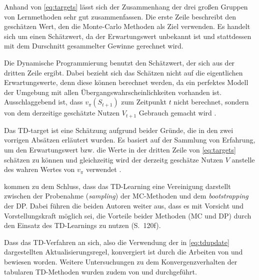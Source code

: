 Anhand von \ref{eq:targets} lässt sich der Zusammenhang der drei großen Gruppen von Lernmethoden sehr gut zusammenfassen. Die erste Zeile beschreibt den geschätzen Wert, den die Monte-Carlo Methoden als Ziel verwenden. Es handelt sich um einen Schätzwert, da der Erwartungswert unbekannt ist und stattdessen mit dem Durschnitt gesammelter Gewinne gerechnet wird. 
\par 
Die Dynamische Programmierung benutzt den Schätzwert, der sich aus der dritten Zeile ergibt. Dabei bezieht sich das Schätzen nicht auf die eigentlichen Erwartungswerte, denn diese können berechnet werden, da ein perfektes Modell der Umgebung mit allen Übergangswahrscheinlichkeiten vorhanden ist. Ausschlaggebend ist, dass $v_\pi(S_{t+1})$ zum Zeitpunkt $t$ nicht berechnet, sondern von dem derzeitige geschätzte Nutzen $V_{t+1}$ Gebrauch gemacht wird \cite[S.~120]{Sutton1998}.
\par 
Das TD-target ist eine Schätzung aufgrund beider Gründe, die in den zwei vorrigen Absätzen erläutert wurden. Es basiert auf der Sammlung von Erfahrung, um den Erwartungswert bzw. die Werte in der dritten Zeile von \ref{eq:targets} schätzen zu können und gleichzeitig wird der derzeitg geschätze Nutzen $V$ anstelle des wahren Wertes von $v_\pi$ verwendet \cite[S.~120f]{Sutton1998}.
\par
\cite{Sutton1998} kommen zu dem Schluss, dass das TD-Learning eine Vereinigung darstellt zwischen der Probenahme (\textit{sampling}) der MC-Methoden und dem \textit{bootstrapping} der DP. Dabei führen die beiden Autoren weiter aus, dass es mit \glqq Vorsicht und Vorstellungskraft \grqq{} möglich sei, die Vorteile beider Methoden (MC und DP) durch den Einsatz des TD-Learnings zu nutzen (S.~120f).
\par
Dass das TD-Verfahren an sich, also die Verwendung der in \ref{eq:tdupdate} dargestellten Aktualisierungsregel, konvergiert ist durch die Arbeiten von \cite{sutton1988TD} und \cite{dayan} bewiesen worden. Weitere Untersuchungen zu dem Konvergenzverhalten der tabularen TD-Methoden wurden zudem von \cite{jaakkola1994convergence} und \cite{tsitsiklis1994asynchronous} durchgeführt.
\pagebreak
